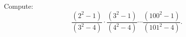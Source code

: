 Compute: \[\dfrac{(2^{2}-1)}{(3^{2}-4)}\cdot\dfrac{(3^{2}-1)}{(4^{2}-4)}\cdots\dfrac{(100^{2}-1)}{(101^{2}-4)}.\]
